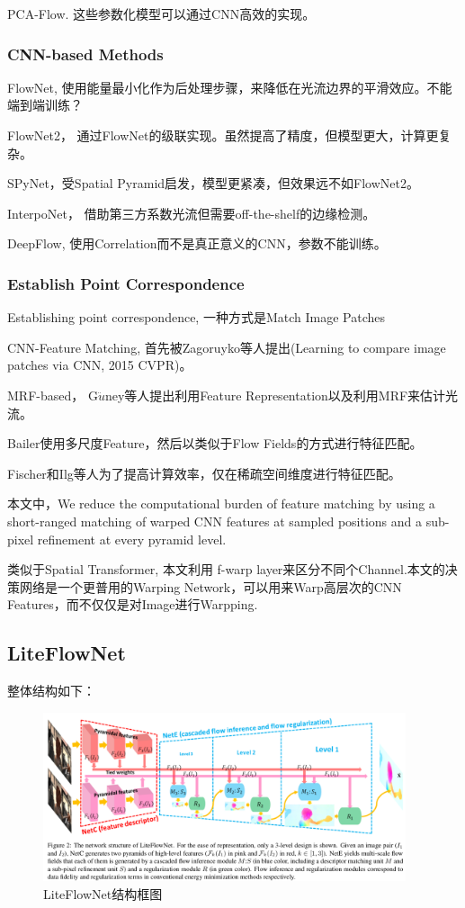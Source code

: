 PCA-Flow. 这些参数化模型可以通过CNN高效的实现。

\subsubsection{CNN-based Methods}

FlowNet, 使用能量最小化作为后处理步骤，来降低在光流边界的平滑效应。不能端到端训练？

FlowNet2， 通过FlowNet的级联实现。虽然提高了精度，但模型更大，计算更复杂。

SPyNet，受Spatial Pyramid启发，模型更紧凑，但效果远不如FlowNet2。

InterpoNet， 借助第三方系数光流但需要off-the-shelf的边缘检测。

DeepFlow, 使用Correlation而不是真正意义的CNN，参数不能训练。

\subsubsection{Establish Point Correspondence}

Establishing point correspondence, 一种方式是Match Image Patches

CNN-Feature Matching, 首先被Zagoruyko等人提出(Learning to compare image patches via CNN, 2015 CVPR)。

MRF-based， G$\ddot{u}$ney等人提出利用Feature Representation以及利用MRF来估计光流。

Bailer使用多尺度Feature，然后以类似于Flow Fields的方式进行特征匹配。

Fischer和Ilg等人为了提高计算效率，仅在稀疏空间维度进行特征匹配。

本文中，We reduce the computational burden of feature matching by using a short-ranged matching of warped CNN features at sampled positions and a sub-pixel refinement at every pyramid level.

类似于Spatial Transformer, 本文利用 f-warp layer来区分不同个Channel.本文的决策网络是一个更普用的Warping Network，可以用来Warp高层次的CNN Features，而不仅仅是对Image进行Warpping.


\subsection{LiteFlowNet}

整体结构如下：
\begin{figure}[!hbtp]
\centering
\includegraphics[width=0.95\textwidth]{SemanticSLAM/LiteFlowNet0.png}
\caption{LiteFlowNet结构框图}
\label{LiteFlowNet0}
\end{figure}

